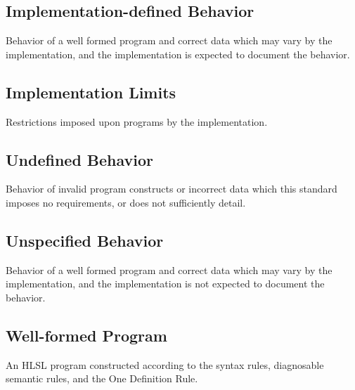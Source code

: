 \subsection{Implementation-defined Behavior}
\p Behavior of a well formed program and correct data which may vary by the
implementation, and the implementation is expected to document the behavior.

\subsection{Implementation Limits}
\p Restrictions imposed upon programs by the implementation.

\subsection{Undefined Behavior}

\p Behavior of invalid program constructs or incorrect data which this standard
imposes no requirements, or does not sufficiently detail.

\subsection{Unspecified Behavior}
\p Behavior of a well formed program and correct data which may vary by the
implementation, and the implementation is not expected to document the behavior.

\subsection{Well-formed Program}
\p An HLSL program constructed according to the syntax rules, diagnosable
semantic rules, and the One Definition Rule.
